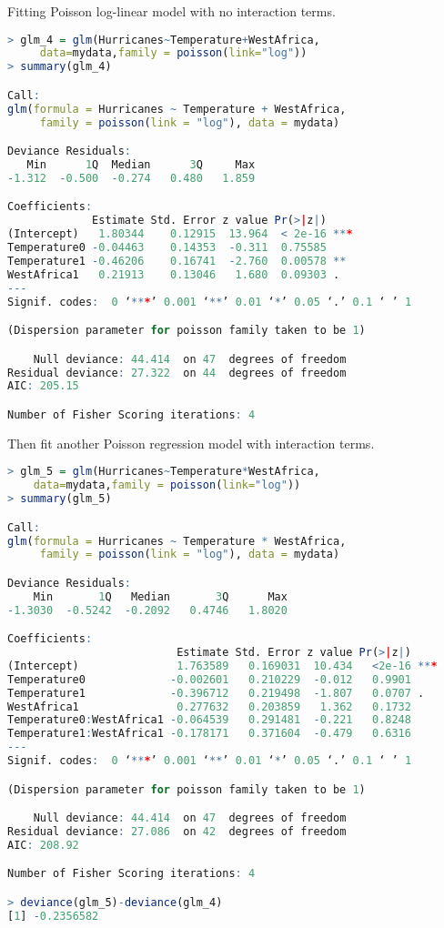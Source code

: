 \documentclass[12pt,a4paper]{article}
\begin{document}
\newline
Fitting Poisson log-linear model with no interaction terms.
\begin{lstlisting}[language  = R]
> glm_4 = glm(Hurricanes~Temperature+WestAfrica,
     data=mydata,family = poisson(link="log")) 
> summary(glm_4) 

Call:
glm(formula = Hurricanes ~ Temperature + WestAfrica, 
     family = poisson(link = "log"), data = mydata)

Deviance Residuals: 
   Min      1Q  Median      3Q     Max  
-1.312  -0.500  -0.274   0.480   1.859  

Coefficients:
             Estimate Std. Error z value Pr(>|z|)    
(Intercept)   1.80344    0.12915  13.964  < 2e-16 ***
Temperature0 -0.04463    0.14353  -0.311  0.75585    
Temperature1 -0.46206    0.16741  -2.760  0.00578 ** 
WestAfrica1   0.21913    0.13046   1.680  0.09303 .  
---
Signif. codes:  0 ‘***’ 0.001 ‘**’ 0.01 ‘*’ 0.05 ‘.’ 0.1 ‘ ’ 1

(Dispersion parameter for poisson family taken to be 1)

    Null deviance: 44.414  on 47  degrees of freedom
Residual deviance: 27.322  on 44  degrees of freedom
AIC: 205.15

Number of Fisher Scoring iterations: 4
\end{lstlisting}
Then ﬁt another Poisson regression model with interaction terms. 
\begin{lstlisting}[language = R]
> glm_5 = glm(Hurricanes~Temperature*WestAfrica,
    data=mydata,family = poisson(link="log")) 
> summary(glm_5)

Call:
glm(formula = Hurricanes ~ Temperature * WestAfrica, 
     family = poisson(link = "log"), data = mydata)

Deviance Residuals: 
    Min       1Q   Median       3Q      Max  
-1.3030  -0.5242  -0.2092   0.4746   1.8020  

Coefficients:
                          Estimate Std. Error z value Pr(>|z|)    
(Intercept)               1.763589   0.169031  10.434   <2e-16 ***
Temperature0             -0.002601   0.210229  -0.012   0.9901    
Temperature1             -0.396712   0.219498  -1.807   0.0707 .  
WestAfrica1               0.277632   0.203859   1.362   0.1732    
Temperature0:WestAfrica1 -0.064539   0.291481  -0.221   0.8248    
Temperature1:WestAfrica1 -0.178171   0.371604  -0.479   0.6316    
---
Signif. codes:  0 ‘***’ 0.001 ‘**’ 0.01 ‘*’ 0.05 ‘.’ 0.1 ‘ ’ 1

(Dispersion parameter for poisson family taken to be 1)

    Null deviance: 44.414  on 47  degrees of freedom
Residual deviance: 27.086  on 42  degrees of freedom
AIC: 208.92

Number of Fisher Scoring iterations: 4

> deviance(glm_5)-deviance(glm_4)
[1] -0.2356582
\end{lstlisting}
\end{document}
